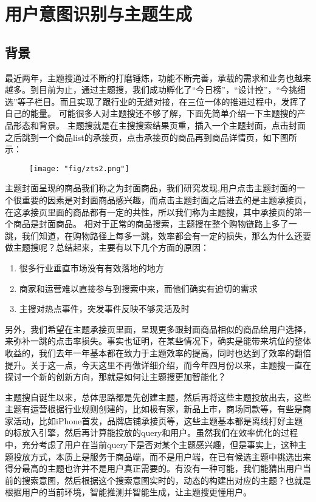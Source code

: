 \section{用户意图识别与主题生成}
\subsection{背景}
 最近两年，主题搜通过不断的打磨锤炼，功能不断完善，承载的需求和业务也越来越多。到目前为止，通过主题搜，我们成功孵化了“今日榜”，“设计控”，“今挑细选”等子栏目。而且实现了跟行业的无缝对接，在三位一体的推进过程中，发挥了自己的能量。
可能很多人对主题搜还不够了解，下面先简单介绍一下主题搜的产品形态和背景。
主题搜就是在主搜搜索结果页重，插入一个主题封面，点击封面之后跳到一个商品list的承接页，点击承接页的商品再到商品详情页，如下图所示：
\begin{figure}[!h]
	\centering
	\texttt{[image: "fig/zts2.png"]}
	\caption{}
	\label{fig:zts2}
\end{figure}


主题封面呈现的商品我们称之为封面商品，我们研究发现,用户点击主题封面的一个很重要的因素是对封面商品感兴趣，而点击主题封面之后进去的是主题承接页，在这承接页里面的商品都有一定的共性，所以我们称为主题搜，其中承接页的第一个商品是封面商品。
相对于正常的商品搜索，主题搜在整个购物链路上多了一跳，我们知道，在购物路径上每多一跳，效率都会有一定的损失，那么为什么还要做主题搜呢？总结起来，主要有以下几个方面的原因：
\begin{enumerate}
\item 很多行业垂直市场没有有效落地的地方
\item 商家和运营难以直接参与到搜索中来，而他们确实有迫切的需求
\item 主搜对热点事件，突发事件反映不够灵活及时  
\end{enumerate}
另外，我们希望在主题承接页里面，呈现更多跟封面商品相似的商品给用户选择，来弥补一跳的点击率损失。事实也证明，在某些情况下，确实是能带来坑位的整体收益的，我们去年一年基本都在致力于主题效率的提高，同时也达到了效率的翻倍提升。关于这一点，今天这里不再做详细介绍，而今年四月份以来，主题搜一直在探讨一个新的创新方向，那就是如何让主题搜更加智能化？
\par 主题搜自诞生以来，总体思路都是先创建主题，然后再将这些主题投放出去，这些主题有运营根据行业规则创建的，比如极有家，新品上市，商场同款等，有些是商家活动，比如iPhone首发，品牌店铺承接页等，这些主题基本都是离线打好主题的标放入引擎，然后再计算能投放的query和用户。虽然我们在效率优化的过程中，充分考虑了用户在当前query下是否对某个主题感兴趣，但是事实上，这种主题投放方式，本质上是服务于商品端，而不是用户端，在已有候选主题中挑选出来得分最高的主题也许并不是用户真正需要的。有没有一种可能，我们能猜出用户当前的搜索意图，然后根据这个搜索意图实时的，动态的构建出对应的主题？也就是根据用户的当前环境，智能推测并智能生成，让主题搜更懂用户。 
